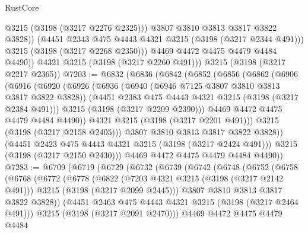 \begin{lexlean}{RustCore}
\begin{coremodule}
                  @3215
                  (@3198 (@3217 @2276 @2325)))
                @3807
                @3810
                @3813
                @3817
                @3822
                @3828))
            (@4451 @2343 @475 @4443 @4321 @3215 (@3198 (@3217 @2344 @491)))
            @3215
            (@3198 (@3217 @2268 @2350)))
          @4469
          @4472
          @4475
          @4479
          @4484
          @4490))
      @4321
      @3215
      (@3198 (@3217 @2260 @491)))
    @3215
    (@3198 (@3217 @2217 @2365))
@7203 := @6832
    (@6836
      (@6842
        (@6852
          (@6856
            (@6862
              (@6906
                (@6916
                  (@6920
                    (@6926
                      (@6936
                        (@6940 (@6946 @7125 @3807 @3810 @3813 @3817 @3822 @3828))
                        (@4451 @2383 @475 @4443 @4321 @3215 (@3198 (@3217 @2384 @491)))
                        @3215
                        (@3198 (@3217 @2209 @2390)))
                      @4469
                      @4472
                      @4475
                      @4479
                      @4484
                      @4490))
                  @4321
                  @3215
                  (@3198 (@3217 @2201 @491)))
                @3215
                (@3198 (@3217 @2158 @2405)))
              @3807
              @3810
              @3813
              @3817
              @3822
              @3828))
          (@4451 @2423 @475 @4443 @4321 @3215 (@3198 (@3217 @2424 @491)))
          @3215
          (@3198 (@3217 @2150 @2430)))
        @4469
        @4472
        @4475
        @4479
        @4484
        @4490))
@7283 := @6709
    (@6719
      (@6729
        (@6732
          (@6739
            (@6742
              (@6748
                (@6752
                  (@6758
                    (@6768
                      (@6772
                        (@6778
                          (@6822
                            (@7203 @4321 @3215 (@3198 (@3217 @2142 @491)))
                            @3215
                            (@3198 (@3217 @2099 @2445)))
                          @3807
                          @3810
                          @3813
                          @3817
                          @3822
                          @3828))
                      (@4451 @2463 @475 @4443 @4321 @3215 (@3198 (@3217 @2464 @491)))
                      @3215
                      (@3198 (@3217 @2091 @2470)))
                    @4469
                    @4472
                    @4475
                    @4479
                    @4484

\end{coremodule}
\end{lexlean}
